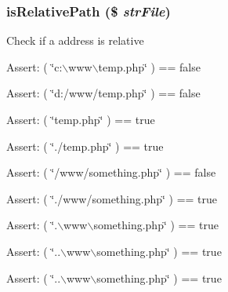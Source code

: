 \hypertarget{class_code_to_diagram_951b7900d3c0a1ffaeda89963456441c}{
\subsubsection[{isRelativePath}]{\setlength{\rightskip}{0pt plus 5cm}isRelativePath (\$ {\em strFile})}}
\label{class_code_to_diagram_951b7900d3c0a1ffaeda89963456441c}


Check if a address is relative

\begin{Desc}
\item[Assert:]( \char`\"{}c:$\backslash$www$\backslash$temp.php\char`\"{} ) == false \end{Desc}
\begin{Desc}
\item[Assert:]( \char`\"{}d:/www/temp.php\char`\"{} ) == false \end{Desc}
\begin{Desc}
\item[Assert:]( \char`\"{}temp.php\char`\"{} ) == true \end{Desc}
\begin{Desc}
\item[Assert:]( \char`\"{}./temp.php\char`\"{} ) == true \end{Desc}
\begin{Desc}
\item[Assert:]( \char`\"{}/www/something.php\char`\"{} ) == false \end{Desc}
\begin{Desc}
\item[Assert:]( \char`\"{}./www/something.php\char`\"{} ) == true \end{Desc}
\begin{Desc}
\item[Assert:]( \char`\"{}.$\backslash$www$\backslash$something.php\char`\"{} ) == true \end{Desc}
\begin{Desc}
\item[Assert:]( \char`\"{}..$\backslash$www$\backslash$something.php\char`\"{} ) == true \end{Desc}
\begin{Desc}
\item[Assert:]( \char`\"{}..$\backslash$www$\backslash$something.php\char`\"{} ) == true \end{Desc}


